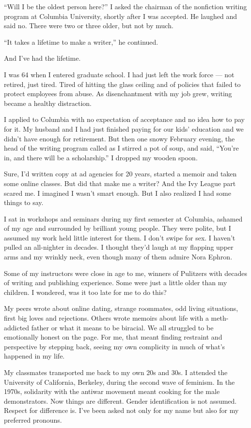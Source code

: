 ``Will I be the oldest person here?'' I asked the chairman of the
nonfiction writing program at Columbia University, shortly after I was
accepted. He laughed and said no. There were two or three older, but not
by much.

``It takes a lifetime to make a writer,'' he continued.

And I've had the lifetime.

I was 64 when I entered graduate school. I had just left the work force
--- not retired, just tired. Tired of hitting the glass ceiling and of
policies that failed to protect employees from abuse. As disenchantment
with my job grew, writing became a healthy distraction.

I applied to Columbia with no expectation of acceptance and no idea how
to pay for it. My husband and I had just finished paying for our kids'
education and we didn't have enough for retirement. But then one snowy
February evening, the head of the writing program called as I stirred a
pot of soup, and said, ``You're in, and there will be a scholarship.'' I
dropped my wooden spoon.

Sure, I'd written copy at ad agencies for 20 years, started a memoir and
taken some online classes. But did that make me a writer? And the Ivy
League part scared me. I imagined I wasn't smart enough. But I also
realized I had some things to say.

I sat in workshops and seminars during my first semester at Columbia,
ashamed of my age and surrounded by brilliant young people. They were
polite, but I assumed my work held little interest for them. I don't
swipe for sex. I haven't pulled an all-nighter in decades. I thought
they'd laugh at my flapping upper arms and my wrinkly neck, even though
many of them admire Nora Ephron.

Some of my instructors were close in age to me, winners of Pulitzers
with decades of writing and publishing experience. Some were just a
little older than my children. I wondered, was it too late for me to do
this?

My peers wrote about online dating, strange roommates, odd living
situations, first big loves and rejections. Others wrote memoirs about
life with a meth-addicted father or what it means to be biracial. We all
struggled to be emotionally honest on the page. For me, that meant
finding restraint and perspective by stepping back, seeing my own
complicity in much of what's happened in my life.

My classmates transported me back to my own 20s and 30s. I attended the
University of California, Berkeley, during the second wave of feminism.
In the 1970s, solidarity with the antiwar movement meant cooking for the
male demonstrators. Now things are different. Gender identification is
not assumed. Respect for difference is. I've been asked not only for my
name but also for my preferred pronouns.

